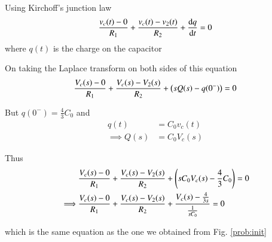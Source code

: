 \documentclass[journal,12pt,twocolumn]{IEEEtran}
\renewcommand\thesection{\arabic{section}}
\begin{document}
\begin{enumerate}[label=\arabic*.,ref=\thesection.\theenumi]
            \solution Using Kirchoff's junction law
            \begin{align}
                \frac{v_c(t) - 0}{R_1} + \frac{v_c(t) - v_2(t)}{R_2} + \frac{\mathrm{d} q}{\mathrm{d} t} = 0
            \end{align}
            where $q(t)$ is the charge on the capacitor
            
            On taking the Laplace transform on both sides of this equation
            \begin{align}
                \frac{V_c(s) - 0}{R_1} + \frac{V_c(s) - V_2(s)}{R_2} + \left(sQ(s) - q(0^-)\right) = 0
            \end{align}
            
            But $q(0^-) = \frac43 C_0$ and 
            \begin{align}
                q(t) &= C_0v_c(t) \\
                \implies Q(s) &= C_0V_c(s)
            \end{align}
            
            Thus
            \begin{align}
                &\frac{V_c(s) - 0}{R_1} + \frac{V_c(s) - V_2(s)}{R_2} + \left(sC_0V_c(s) - \frac43 C_0\right) = 0 \\
                \implies &\frac{V_c(s) - 0}{R_1} + 	\frac{V_c(s) - V_2(s)}{R_2} + \frac{V_c(s) - \frac{4}{3s}}{\frac{1}{sC_0}} = 0 
            \end{align}
            
            which is the same equation as the one we obtained from Fig. \ref{prob:init}
            \end{enumerate}
            
\end{document}
